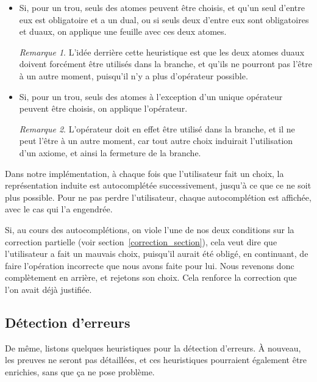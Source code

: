 \documentclass[11pt,a4paper]{article}
\theoremstyle{plain}
\theoremstyle{definition}
\theoremstyle{remark}
\newtheorem{remark}{Remarque}
\begin{document}
\begin{itemize}
    \item Si, pour un trou, seuls des atomes peuvent être choisis, et qu'un seul d'entre eux est obligatoire et a un dual, ou si seuls deux d'entre eux sont obligatoires et duaux, on applique une feuille avec ces deux atomes.

    \begin{remark}
        L'idée derrière cette heuristique est que les deux atomes duaux doivent forcément être utilisés dans la branche, et qu'ils ne pourront pas l'être à un autre moment, puisqu'il n'y a plus d'opérateur possible.
    \end{remark}

    \item Si, pour un trou, seuls des atomes à l'exception d'un unique opérateur peuvent être choisis, on applique l'opérateur.

    \begin{remark}
        L'opérateur doit en effet être utilisé dans la branche, et il ne peut l'être à un autre moment, car tout autre choix induirait l'utilisation d'un axiome, et ainsi la fermeture de la branche.
    \end{remark}
\end{itemize}

Dans notre implémentation, à chaque fois que l'utilisateur fait un choix, la représentation induite est autocomplétée successivement, jusqu'à ce que ce ne soit plus possible. Pour ne pas perdre l'utilisateur, chaque autocomplétion est affichée, avec le cas qui l'a engendrée.

Si, au cours des autocomplétions, on viole l'une de nos deux conditions sur la correction partielle (voir section~\ref{correction_section}), cela veut dire que l'utilisateur a fait un mauvais choix, puisqu'il aurait été obligé, en continuant, de faire l'opération incorrecte que nous avons faite pour lui. Nous revenons donc complètement en arrière, et rejetons son choix. Cela renforce la correction que l'on avait déjà justifiée.

\subsection{Détection d'erreurs}

De même, listons quelques heuristiques pour la détection d'erreurs. À nouveau, les preuves ne seront pas détaillées, et ces heuristiques pourraient également être enrichies, sans que ça ne pose problème.
\end{document}
